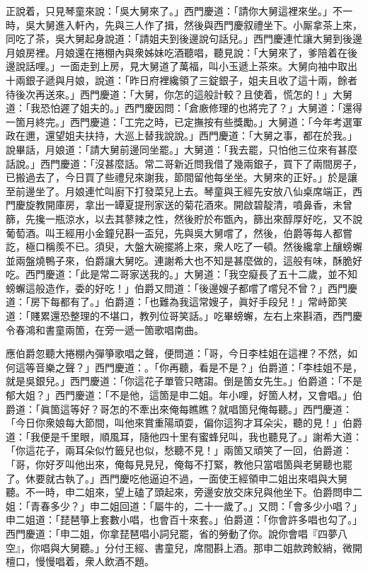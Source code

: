 正說着，只見琴童來說：「吳大舅來了。」西門慶道：「請你大舅這裡來坐。」不一時，吳大舅進入軒內，先與三人作了揖，然後與西門慶叙禮坐下。小厮拿茶上來，同吃了茶，吳大舅起身說道：「請姐夫到後邊說句話兒。」西門慶連忙讓大舅到後邊月娘房裡。月娘還在捲棚內與衆姊妹吃酒聽唱，聽見說：「大舅來了，爹陪着在後邊說話哩。」一面走到上房，見大舅道了萬福，叫小玉遞上茶來。大舅向袖中取出十兩銀子遞與月娘，說道：「昨日府裡纔領了三錠銀子，姐夫且收了這十兩，餘者待後次再送來。」西門慶道：「大舅，你怎的這般計較？且使着，慌怎的！」大舅道：「我恐怕遲了姐夫的。」西門慶因問：「倉廒修理的也將完了？」大舅道：「還得一箇月終完。」西門慶道：「工完之時，已定撫按有些獎勵。」大舅道：「今年考選軍政在邇，還望姐夫扶持，大巡上替我說說。」西門慶道：「大舅之事，都在於我。」說畢話，月娘道：「請大舅前邊同坐罷。」大舅道：「我去罷，只怕他三位來有甚麼話說。」西門慶道：「沒甚麼話。常二哥新近問我借了幾兩銀子，買下了兩間房子，已搬過去了，今日買了些禮兒來謝我，節間留他每坐坐。大舅來的正好。」於是讓至前邊坐了。月娘連忙叫廚下打發菜兒上去。琴童與王經先安放八仙桌席端正，西門慶旋教開庫房，拿出一罈夏提刑家送的菊花酒來。開啟碧靛清，噴鼻香，未曾篩，先攙一瓶涼水，以去其蓼辣之性，然後貯於布甑內，篩出來醇厚好吃，又不說葡萄酒。叫王經用小金鐘兒斟一盃兒，先與吳大舅嚐了，然後，伯爵等每人都嘗訖，極口稱羨不已。須臾，大盤大碗擺將上來，衆人吃了一頓。然後纔拿上釀螃蠏並兩盤燒鴨子來，伯爵讓大舅吃。連謝希大也不知是甚麼做的，這般有味，酥脆好吃。西門慶道：「此是常二哥家送我的。」大舅道：「我空癡長了五十二歲，並不知螃蠏這般造作，委的好吃！」伯爵又問道：「後邊嫂子都嚐了嚐兒不曾？」西門慶道：「房下每都有了。」伯爵道：「也難為我這常嫂子，眞好手段兒！」常峙節笑道：「賤累還恐整理的不堪口，教列位哥笑話。」吃畢螃蠏，左右上來斟酒，西門慶令春鴻和書童兩箇，在旁一遞一箇歌唱南曲。

應伯爵忽聽大捲棚內彈箏歌唱之聲，便問道：「哥，今日李桂姐在這裡？不然，如何這等音樂之聲？」西門慶道：。「你再聽，看是不是？」伯爵道：「李桂姐不是，就是吳銀兒。」西門慶道：「你這花子單管只瞎謅。倒是箇女先生。」伯爵道：「不是郁大姐？」西門慶道：「不是他，這箇是申二姐。年小哩，好箇人材，又會唱。」伯爵道：「眞箇這等好？哥怎的不牽出來俺每瞧瞧？就唱箇兒俺每聽。」西門慶道：「今日你衆娘每大節間，叫他來賞重陽頑耍，偏你這狗才耳朵尖，聽的見！」伯爵道：「我便是千里眼，順風耳，隨他四十里有蜜蜂兒叫，我也聽見了。」謝希大道：「你這花子，兩耳朵似竹籤兒也似，愁聽不見！」兩箇又頑笑了一回，伯爵道：「哥，你好歹叫他出來，俺每見見兒，俺每不打緊，教他只當唱箇與老舅聽也罷了。休要就古執了。」西門慶吃他逼迫不過，一面使王經領申二姐出來唱與大舅聽。不一時，申二姐來，望上磕了頭起來，旁邊安放交床兒與他坐下。伯爵問申二姐：「青春多少？」申二姐回道：「屬牛的，二十一歲了。」又問：「會多少小唱？」申二姐道：「琵琶箏上套數小唱，也會百十來套。」伯爵道：「你會許多唱也勾了。」西門慶道：「申二姐，你拿琵琶唱小詞兒罷，省的勞動了你。說你會唱『四夢八空』，你唱與大舅聽。」分付王經、書童兒，席間斟上酒。那申二姐款跨鮫綃，微開檀口，慢慢唱着，衆人飲酒不題。

